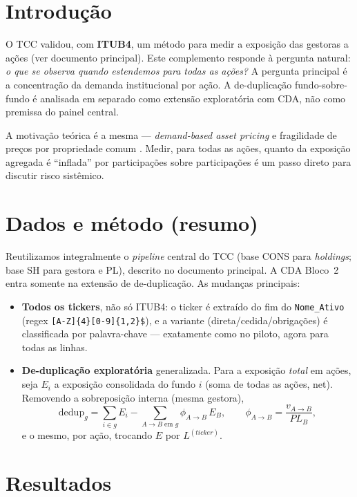 \documentclass[12pt,a4paper]{article}
\begin{document}
\section{Introdução}\label{sec:intro}
O TCC validou, com \textbf{ITUB4}, um método para medir a exposição das gestoras a ações (ver documento
principal). Este complemento responde à pergunta natural: \emph{o que se observa quando estendemos para
todas as ações?} A pergunta principal é a concentração da demanda institucional por ação. A de-duplicação
fundo-sobre-fundo é analisada em separado como extensão exploratória com CDA, não como premissa do painel
central.

A motivação teórica é a mesma --- \emph{demand-based asset pricing} \citep{koijenyogo2019,gabaixkoijen2021} e
fragilidade de preços por propriedade comum \citep{greenwoodthesmar2011}. Medir, para todas as ações, quanto
da exposição agregada é ``inflada'' por participações sobre participações é um passo direto para discutir
risco sistêmico.

\section{Dados e método (resumo)}\label{sec:metodo}
Reutilizamos integralmente o \emph{pipeline} central do TCC (base CONS para \emph{holdings}; base SH para
gestora e PL), descrito no documento principal. A CDA Bloco~2 entra somente na extensão de de-duplicação. As
mudanças principais:
\begin{itemize}
\item \textbf{Todos os tickers}, não só ITUB4: o ticker é extraído do fim do \texttt{Nome\_Ativo}
(regex \texttt{[A-Z]\{4\}[0-9]\{1,2\}\$}), e a variante (direta/cedida/obrigações) é classificada por
palavra-chave --- exatamente como no piloto, agora para todas as linhas.
\item \textbf{De-duplicação exploratória} generalizada. Para a exposição \emph{total} em ações, seja $E_i$ a
exposição consolidada do fundo $i$ (soma de todas as ações, net). Removendo a sobreposição interna (mesma gestora),
\[ \text{dedup}_g = \sum_{i\in g} E_i - \!\!\sum_{A\to B\;\text{em }g}\!\! \phi_{A\to B}\,E_B,
   \qquad \phi_{A\to B} = \frac{v_{A\to B}}{PL_B}, \]
e o mesmo, por ação, trocando $E$ por $L^{(ticker)}$.
\end{itemize}

\section{Resultados}\label{sec:result}
\end{document}
